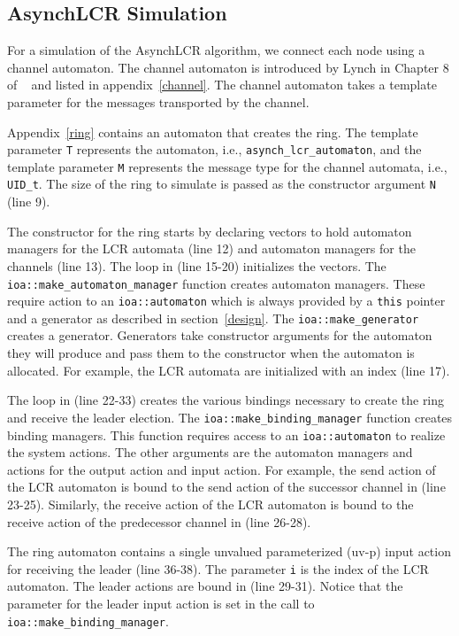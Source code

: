 \subsection{AsynchLCR Simulation}

For a simulation of the AsynchLCR algorithm, we connect each node using a channel automaton.
The channel automaton is introduced by Lynch in Chapter 8 of ~\cite{lynch1996distributed} and listed in appendix~\ref{channel}.
The channel automaton takes a template parameter for the messages transported by the channel.

Appendix~\ref{ring} contains an automaton that creates the ring.
The template parameter \verb+T+ represents the automaton, i.e., \verb+asynch_lcr_automaton+, and the template parameter \verb+M+ represents the message type for the channel automata, i.e., \verb+UID_t+.
The size of the ring to simulate is passed as the constructor argument \verb+N+ (line 9).

The constructor for the ring starts by declaring vectors to hold automaton managers for the LCR automata (line 12) and automaton managers for the channels (line 13).
The loop in (line 15-20) initializes the vectors.
The \verb+ioa::make_automaton_manager+ function creates automaton managers.
These require action to an \verb+ioa::automaton+ which is always provided by a \verb+this+ pointer and a generator as described in section~\ref{design}.
The \verb+ioa::make_generator+ creates a generator.
Generators take constructor arguments for the automaton they will produce and pass them to the constructor when the automaton is allocated.
For example, the LCR automata are initialized with an index (line 17).

The loop in (line 22-33) creates the various bindings necessary to create the ring and receive the leader election.
The \verb+ioa::make_binding_manager+ function creates binding managers.
This function requires access to an \verb+ioa::automaton+ to realize the system actions.
The other arguments are the automaton managers and actions for the output action and input action.
For example, the send action of the LCR automaton is bound to the send action of the successor channel in (line 23-25).
Similarly, the receive action of the LCR automaton is bound to the receive action of the predecessor channel in (line 26-28).

The ring automaton contains a single unvalued parameterized (uv-p) input action for receiving the leader (line 36-38).
The parameter \verb+i+ is the index of the LCR automaton.
The leader actions are bound in (line 29-31).
Notice that the parameter for the leader input action is set in the call to \verb+ioa::make_binding_manager+.

